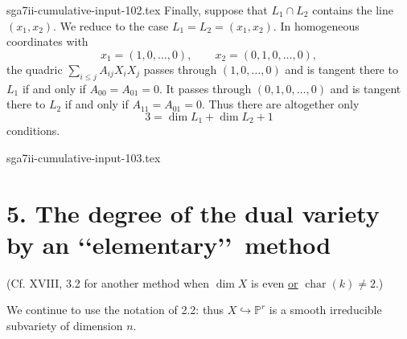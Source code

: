 \begin{filecontents*}{sga7ii-cumulative-input-102.tex}
Finally, suppose that $L_1\cap L_2$ contains the line $(x_1,x_2)$.
We reduce to the case $L_1=L_2=(x_1,x_2)$.  In homogeneous
coordinates with
\[
x_1=(1,0,\ldots,0),\qquad x_2=(0,1,0,\ldots,0),
\]
the quadric $\sum_{i\leq j}A_{ij}X_iX_j$ passes through
$(1,0,\ldots,0)$ and is tangent there to $L_1$ if and only if
$A_{00}=A_{01}=0$.  It passes through $(0,1,0,\ldots,0)$ and is
tangent there to $L_2$ if and only if $A_{11}=A_{01}=0$.  Thus there
are altogether only
\[
3=\dim L_1+\dim L_2+1
\]
conditions.
\end{filecontents*}
\begin{filecontents*}{sga7ii-cumulative-input-103.tex}
\section*{5. The degree of the dual variety by an
\lq\lq elementary\rq\rq\ method}

(Cf. XVIII, 3.2 for another method when $\dim X$ is even
\underline{or} $\operatorname{char}(k)\ne2$.)

We continue to use the notation of 2.2: thus
$X\hookrightarrow\mathbb P^r$ is a smooth irreducible subvariety of
dimension $n$.


\end{filecontents*}
